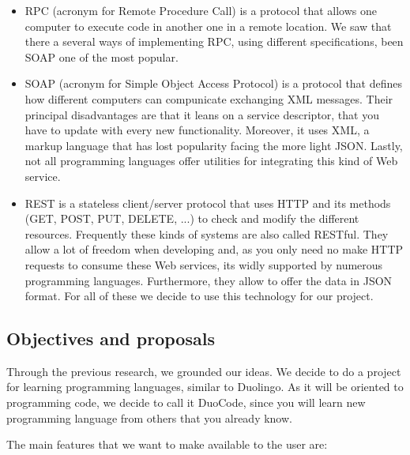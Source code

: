 \begin{itemize}
\item
RPC (acronym for Remote Procedure Call) is a protocol that allows one computer to execute code in another one in a remote location. We saw that there a several ways of implementing RPC, using different specifications, been SOAP one of the most popular.

\item
SOAP (acronym for Simple Object Access Protocol) is a protocol that defines how different computers can compunicate exchanging XML messages. Their principal disadvantages are that it leans on a service descriptor, that you have to update with every new functionality. Moreover, it uses XML, a markup language that has lost popularity facing the more light JSON. Lastly, not all programming languages offer utilities for integrating this kind of Web service.

\item
REST is a stateless client/server protocol that uses HTTP and its methods (GET, POST, PUT, DELETE, ...) to check and modify the different resources. Frequently these kinds of systems are also called RESTful. They allow a lot of freedom when developing and, as you only need no make HTTP requests to consume these Web services, its widly supported by numerous programming languages. Furthermore, they allow to offer the data in JSON format. For all of these we decide to use this technology for our project.

\end{itemize}

\subsection{Objectives and proposals\label{subsec:proposals}}

Through the previous research, we grounded our ideas. We decide to do a project for learning programming languages, similar to Duolingo. As it will be oriented to programming code, we decide to call it DuoCode, since you will learn new programming language from others that you already know.

The main features that we want to make available  to the user are:

